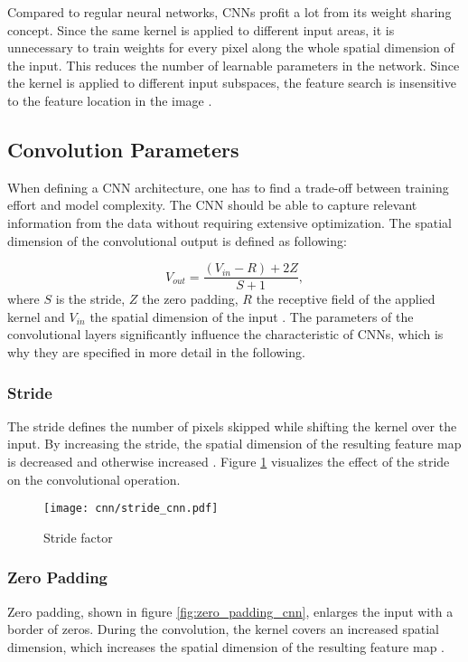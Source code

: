 Compared to regular neural networks, CNNs profit a lot from its weight sharing concept. Since the same kernel is applied to different input areas, it is unnecessary to train weights for every pixel along the whole spatial dimension of the input. This reduces the number of learnable parameters in the network. Since the kernel is applied to different input subspaces, the feature search is insensitive to the feature location in the image \cite{OShea2015}.

\subsection{Convolution Parameters}
When defining a CNN architecture, one has to find a trade-off between training effort and model complexity. The CNN should be able to capture relevant information from the data without requiring extensive optimization. The spatial dimension of the convolutional output is defined as following:

\begin{equation}
  V_{out} = \frac{(V_{in}-R)+2Z}{S+1}, 
  \label{eq:spatial_dimensionality_cnn_feature map}
\end{equation}
where $S$ is the stride, $Z$ the zero padding, $R$ the receptive field of the applied kernel and $V_{in}$ the spatial dimension of the input \cite{OShea2015}. The parameters of the convolutional layers significantly influence the characteristic of CNNs, which is why they are specified in more detail in the following.

\subsubsection{Stride}
The stride defines the number of pixels skipped while shifting the kernel over the input. By increasing the stride, the spatial dimension of the resulting feature map is decreased and otherwise increased \cite{OShea2015}. Figure \ref{fig:stride_cnn} visualizes the effect of the stride on the convolutional operation.

\begin{figure}[H]
  \centering
  \texttt{[image: cnn/stride\_cnn.pdf]}
  \caption {Stride factor}
  \label{fig:stride_cnn}
\end{figure}


\subsubsection{Zero Padding}
Zero padding, shown in figure \ref{fig:zero_padding_cnn}, enlarges the input with a border of zeros. During the convolution, the kernel covers an increased spatial dimension, which increases the spatial dimension of the resulting feature map \cite{OShea2015}.

